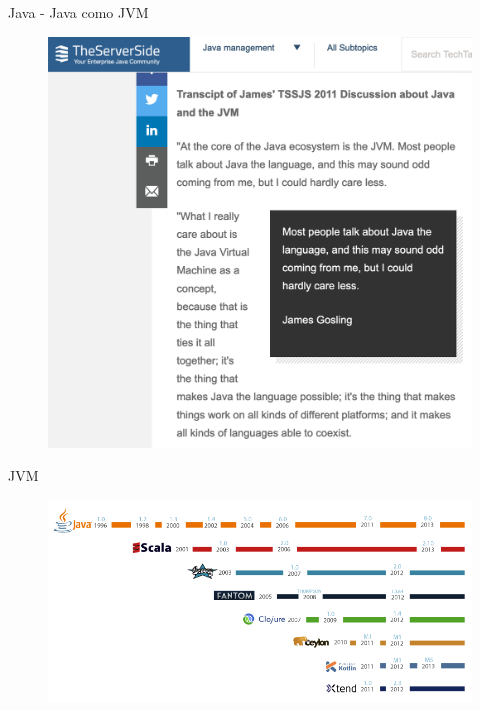 \documentclass[aspectratio=169]{beamer}
\begin{document}
\begin{frame}{Java - Java como JVM}

		\begin{figure}
			\centering
			\includegraphics[width=0.7\linewidth]{Images/gossling}
		\end{figure}
\end{frame}


\begin{frame}{JVM}

    \begin{figure}
        \centering
        \includegraphics[width=\linewidth]{Images/jvm-languages}
    \end{figure}
\end{frame}
\end{document}
